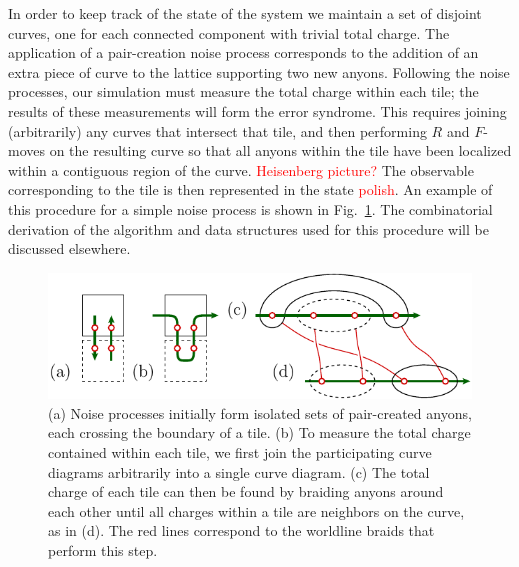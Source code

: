 \documentclass[aps, prl, letterpaper, twocolumn, superscriptaddress, notitlepage, 10pt]{revtex4-1}
\newcommand{\Fref}[1]{Fig.~\ref{#1}}
\newcommand{\cggb}[1]{\textcolor{blue}{#1}}
\newcommand{\dude}[1]{\textcolor{red}{#1}}
\begin{document}
In order to keep track of the state of the system we maintain a set of disjoint curves, 
one for each connected component with trivial total charge.
The application of a pair-creation noise process corresponds to the 
addition of an extra piece of curve to the lattice supporting
two new anyons.
Following the noise processes, our simulation must %
measure the total charge within each tile; the results of 
these measurements will form the error syndrome. 
This requires joining (arbitrarily) any curves that intersect that tile, 
and then performing $R$ and $F$-moves on the resulting
curve so that 
all anyons within the tile have been 
localized within a contiguous region of the curve. 
\dude{Heisenberg picture?}
The observable corresponding to the tile is then
represented in the state \dude{polish}.
An example of this 
procedure for a simple noise process is shown in \Fref{f:syndrome}.
The combinatorial derivation of the algorithm and data structures used for 
this procedure will be discussed elsewhere.

\begin{figure}[t!]
\begin{center}
	\includegraphics[width=1.0\columnwidth]{pic-syndrome.pdf}
\caption{
(a) Noise processes initially form isolated sets of pair-created anyons, 
each crossing the boundary of a tile. 
(b) To measure the total charge 
contained within each tile, 
we first join the participating curve 
diagrams arbitrarily into a single curve diagram.
(c) The total charge of each tile can then be found 
by braiding anyons around each other until all charges within 
a tile are neighbors on the curve, as in (d).  
The red lines correspond to the worldline braids that perform this step.
}
\label{f:syndrome}
\end{center}
\vspace{-10pt}
\end{figure}
\end{document}
